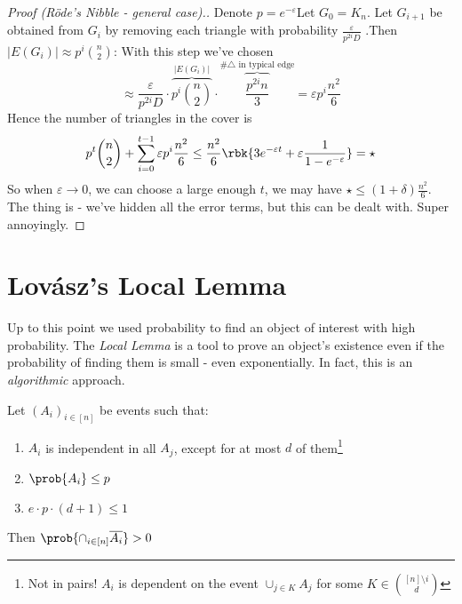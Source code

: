 \documentclass[a4paper, 11pt, oneside]{book}
\begin{document}
\begin{proof}
	[Proof (R\"ode's Nibble - general case).] Denote $p = e^{-\varepsilon}$Let $G_0 = K_n$. Let $G_{i+1}$ be obtained from $G_i$ by removing each triangle with probability $\frac{\varepsilon}{p^{2i}D}$ .Then $|E(G_i)| \approx p^i{n\choose 2}$: With this step we've chosen $$\approx \frac{\varepsilon}{p^{2i}D}\cdot \overbrace{p^i{n\choose 2}}^{|E(G_i)|}\cdot  \overbrace{\frac{p^{2i}n}{3}}^{\text{\# $\triangle$ in typical edge}} = \varepsilon p^i\frac{n^2}{6}$$
	Hence the number of triangles in the cover is
	\[
	p^t{n\choose 2} + \sum_{i=0}^{t-1}\varepsilon p^i\frac{n^2}{6} \le \frac{n^2}{6}\rbk{3e^{-\varepsilon t} + \varepsilon\frac{1}{1-e^{-\varepsilon}}} = \star
	\]
	So when $\varepsilon\to 0$, we can choose a large enough $t$, we may have $\star \le (1+\delta)\frac{n^2}{6}$. The thing is - we've hidden all the error terms, but this can be dealt with. Super annoyingly.
\end{proof}

\chapter{Lov\'asz's Local Lemma}
Up to this point we used probability to find an object of interest with high probability.  The \emph{Local Lemma} is a tool to prove an object's existence even if the probability of finding them is small - even exponentially. In fact, this is an \emph{algorithmic} approach.
\begin{yellowBox}
\begin{lemma}
	\label{Local Lemma} Let $(A_i)_{i\in [n]}$ be events such that:
	\begin{enumerate}
  \item  $A_i$ is independent in all $A_j$, except for at most $d$ of them\footnote{Not in pairs! $A_i$ is dependent on the event $\cup_{j\in K} A_j$ for some $K\in {[n]\setminus i\choose d}$}
	\item $\prob{A_i} \le p$
	\item $e\cdot p\cdot (d+1)\le 1$
\end{enumerate}
Then $\prob{\cap_{i\in [n]}\overline{A_i}} > 0$
\end{lemma}	
\end{yellowBox}
\end{document}
